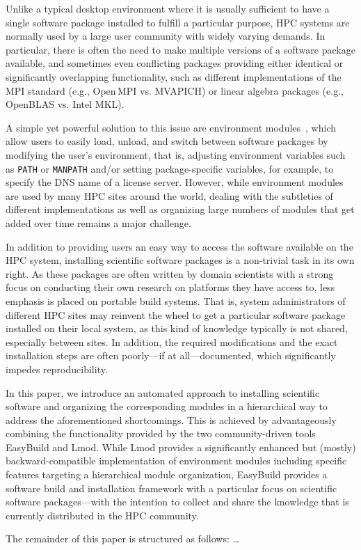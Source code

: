 Unlike a typical desktop environment where it is usually sufficient to have a
single software package installed to fulfill a particular purpose, HPC
systems are normally used by a large user community with widely varying
demands. In particular, there is often the need to make multiple versions of
a software package available, and sometimes even conflicting packages
providing either identical or significantly overlapping functionality, such
as different implementations of the MPI standard (e.g., Open\,MPI vs.
MVAPICH) or linear algebra packages (e.g., OpenBLAS vs. Intel MKL).

A simple yet powerful solution to this issue are environment
modules~\cite{environment_modules_paper}, which allow users to easily load,
unload, and switch between software packages by  modifying the user's
environment, that is, adjusting environment variables such as \texttt{PATH}
or \texttt{MANPATH} and/or setting package-specific variables, for example,
to specify the DNS name of a license server. However, while environment
modules are used by many HPC sites around the world, dealing with the
subtleties of different implementations as well as organizing large numbers
of modules that get added over time remains a major challenge.

In addition to providing users an easy way to access the software available
on the HPC system, installing scientific software packages is a non-trivial
task in its own right. As these packages are often written by domain
scientists with a strong focus on conducting their own research on platforms
they have access to, less emphasis is placed on portable build systems. That
is, system administrators of different HPC sites may reinvent the wheel to
get a particular software package installed on their local system, as this
kind of knowledge typically is not shared, especially between sites. In
addition, the required modifications and the exact installation steps are
often poorly---if at all---documented, which significantly impedes
reproducibility.

In this paper, we introduce an automated approach to installing scientific
software and organizing the corresponding modules in a hierarchical way to
address the aforementioned shortcomings. This is achieved by advantageously
combining the functionality provided by the two community-driven tools
EasyBuild and Lmod. While Lmod provides a significantly enhanced but (mostly)
backward-compatible implementation of environment modules including specific
features targeting a hierarchical module organization, EasyBuild provides a
software build and installation framework with a particular focus on
scientific software packages---with the intention to collect and share the
knowledge that is currently distributed in the HPC community.

The remainder of this paper is structured as follows: \ldots

